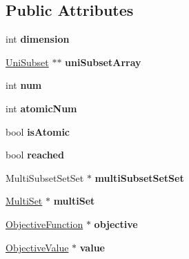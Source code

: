\subsection*{Public Attributes}
\begin{DoxyCompactItemize}
\item 
\hypertarget{classMultiSubset_ad41b9d11d3ebdcd439b7763fd34337d7}{int {\bfseries dimension}}\label{classMultiSubset_ad41b9d11d3ebdcd439b7763fd34337d7}

\item 
\hypertarget{classMultiSubset_a979e9aef42f4ddebae400c3dc32a9e34}{\hyperlink{classUniSubset}{Uni\-Subset} $\ast$$\ast$ {\bfseries uni\-Subset\-Array}}\label{classMultiSubset_a979e9aef42f4ddebae400c3dc32a9e34}

\item 
\hypertarget{classMultiSubset_ad7e0ebe07d2ebb4b4a1aac893c17437d}{int {\bfseries num}}\label{classMultiSubset_ad7e0ebe07d2ebb4b4a1aac893c17437d}

\item 
\hypertarget{classMultiSubset_ab72b89d8458e938b696091e411561c79}{int {\bfseries atomic\-Num}}\label{classMultiSubset_ab72b89d8458e938b696091e411561c79}

\item 
\hypertarget{classMultiSubset_a3eb7535caff881684041249adeb23059}{bool {\bfseries is\-Atomic}}\label{classMultiSubset_a3eb7535caff881684041249adeb23059}

\item 
\hypertarget{classMultiSubset_ac66e2eec4cffacea92242f0268d898af}{bool {\bfseries reached}}\label{classMultiSubset_ac66e2eec4cffacea92242f0268d898af}

\item 
\hypertarget{classMultiSubset_a780669f9a3311ca91982a49bd8032f5b}{Multi\-Subset\-Set\-Set $\ast$ {\bfseries multi\-Subset\-Set\-Set}}\label{classMultiSubset_a780669f9a3311ca91982a49bd8032f5b}

\item 
\hypertarget{classMultiSubset_a6612ee8ac49ca1a8e696313624351d2b}{\hyperlink{classMultiSet}{Multi\-Set} $\ast$ {\bfseries multi\-Set}}\label{classMultiSubset_a6612ee8ac49ca1a8e696313624351d2b}

\item 
\hypertarget{classMultiSubset_a3a3d787aee31eec377ab4c7a3206d6c9}{\hyperlink{classObjectiveFunction}{Objective\-Function} $\ast$ {\bfseries objective}}\label{classMultiSubset_a3a3d787aee31eec377ab4c7a3206d6c9}

\item 
\hypertarget{classMultiSubset_a186ff469f85f6f7c044a18f0bbb8b481}{\hyperlink{classObjectiveValue}{Objective\-Value} $\ast$ {\bfseries value}}\label{classMultiSubset_a186ff469f85f6f7c044a18f0bbb8b481}


\end{DoxyCompactItemize}
